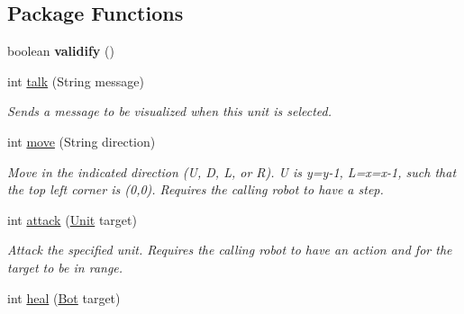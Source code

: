\subsection*{Package Functions}
\begin{DoxyCompactItemize}
\item 
\hypertarget{classBot_a1e1c0cd44d4bbba5b8111e5ae4fb07fa}{
boolean {\bfseries validify} ()}
\label{classBot_a1e1c0cd44d4bbba5b8111e5ae4fb07fa}

\item 
\hypertarget{classBot_a6f8c1424e8973080a7d36a274c18ac98}{
int \hyperlink{classBot_a6f8c1424e8973080a7d36a274c18ac98}{talk} (String message)}
\label{classBot_a6f8c1424e8973080a7d36a274c18ac98}

\begin{DoxyCompactList}\small\item\em Sends a message to be visualized when this unit is selected. \item\end{DoxyCompactList}\item 
\hypertarget{classBot_a2085552541da326273e8bf793f14f4ed}{
int \hyperlink{classBot_a2085552541da326273e8bf793f14f4ed}{move} (String direction)}
\label{classBot_a2085552541da326273e8bf793f14f4ed}

\begin{DoxyCompactList}\small\item\em Move in the indicated direction (U, D, L, or R). U is y=y-\/1, L=x=x-\/1, such that the top left corner is (0,0). Requires the calling robot to have a step. \item\end{DoxyCompactList}\item 
\hypertarget{classBot_a98de8f304ec856d6425dee2cf410e150}{
int \hyperlink{classBot_a98de8f304ec856d6425dee2cf410e150}{attack} (\hyperlink{classUnit}{Unit} target)}
\label{classBot_a98de8f304ec856d6425dee2cf410e150}

\begin{DoxyCompactList}\small\item\em Attack the specified unit. Requires the calling robot to have an action and for the target to be in range. \item\end{DoxyCompactList}\item 
\hypertarget{classBot_a941642a4058280482a3ccadf140704e8}{
int \hyperlink{classBot_a941642a4058280482a3ccadf140704e8}{heal} (\hyperlink{classBot}{Bot} target)}
\label{classBot_a941642a4058280482a3ccadf140704e8}


\end{DoxyCompactItemize}
